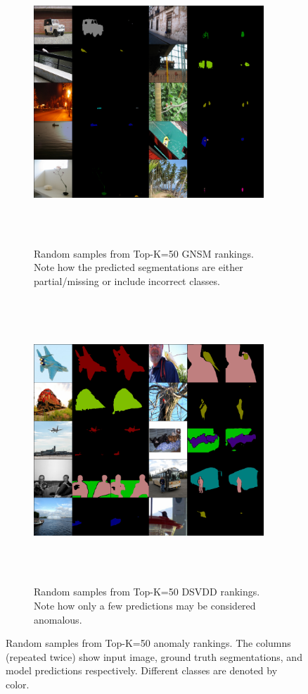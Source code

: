 \begin{figure}\label{fig:samples}
     \begin{subfigure}[t]{0.92\textwidth}
         \centering
        \includegraphics[width=0.95\textwidth, height=4.2in]{figures/msma_rand_samples_s.pdf}
      \caption{Random samples from Top-K=50 GNSM rankings. Note how the predicted segmentations are either partial/missing or include incorrect classes.}
      \label{fig:gnsm_samples}
     \end{subfigure}

     \begin{subfigure}[t]{0.92\textwidth}
         \centering
         \includegraphics[width=0.95\textwidth, height=4.2in]{figures/dsvdd_rand_samples_s.pdf}
         \caption{Random samples from Top-K=50 DSVDD rankings. Note how only a few predictions may be considered anomalous.}
         \label{fig:dsvdd_samples}
     \end{subfigure}
\caption{Random samples from Top-K=50 anomaly rankings. The columns (repeated twice) show input image, ground truth segmentations, and model predictions respectively. Different classes are denoted by color.}
\end{figure}

